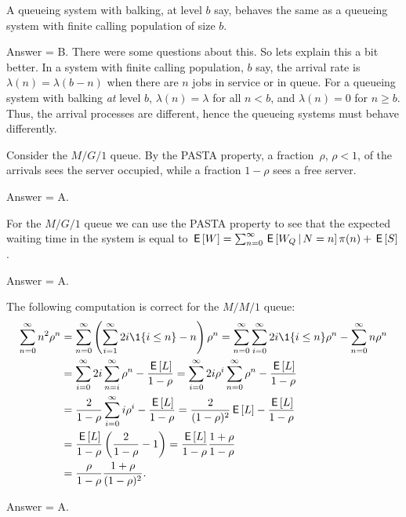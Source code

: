 \begin{exercise}[201803]
A queueing system with balking, at level $b$ say, behaves the same as a queueing system with finite calling   population of size $b$.
\begin{solution}
Answer = B. There were some questions about this. So lets explain this a bit better. In a system with finite calling population, $b$ say, the arrival rate is $\lambda(n) = \lambda(b-n)$ when there are $n$ jobs in service or in queue. For a queueing system with balking \emph{at} level $b$, $\lambda(n)=\lambda$ for all $n<b$, and $\lambda(n)=0$ for $n\geq b$. Thus, the arrival processes are different, hence the queueing systems must behave differently.
\end{solution}
\end{exercise}

\begin{exercise}[201803]
Consider the $M/G/1$ queue. 
By the PASTA property, a fraction~$\rho$, $\rho<1$,  of the arrivals sees the server occupied, while a fraction $1-\rho$ sees a free server.  
\begin{solution}
Answer = A.
\end{solution}
\end{exercise}

\begin{exercise}[201803]
For the $M/G/1$ queue we can   use the PASTA property to see that the expected waiting time in the
  system is equal to
  $\,\mathsf{E}\left[W\right] = \sum_{n=0}^\infty \,\mathsf{E}\left[W_Q \,\middle|\, N=n\right] \pi(n) + \,\mathsf{E}\left[S\right]$.
\begin{solution}
Answer = A.
\end{solution}
\end{exercise}

\begin{exercise}[201803]
The following computation is correct for the $M/M/1$ queue:
\begin{equation*}
  \begin{split}
    \sum_{n=0}^\infty n^2 \rho^n 
&=    \sum_{n=0}^\infty \left(\sum_{i=1}^\infty 2i \1{i\leq n}  - n\right)\rho^n 
=    \sum_{n=0}^\infty \sum_{i=0}^\infty 2i\1{i\leq n}\rho^n  - \sum_{n=0}^\infty n\rho^n \\
&=    \sum_{i=0}^\infty 2i \sum_{n=i}^\infty \rho^n  - \frac{\E L}{1-\rho} 
=    \sum_{i=0}^\infty 2i \rho^i \sum_{n=0}^\infty \rho^n  - \frac{\E L}{1-\rho} \\
&=    \frac2{1-\rho} \sum_{i=0}^\infty i \rho^i   - \frac{\E L}{1-\rho} 
=    \frac2{(1-\rho)^2} \E L - \frac{\E L}{1-\rho} \\
&=    \frac{\E L}{1-\rho}  \left(\frac2{1-\rho}  - 1\right) 
=    \frac{\E L}{1-\rho}  \frac{1+\rho}{1-\rho} \\
&=    \frac{\rho}{1-\rho}  \frac{1+\rho}{(1-\rho)^2}.
\end{split}
\end{equation*}

\begin{solution}
Answer = A.
\end{solution}
\end{exercise}

